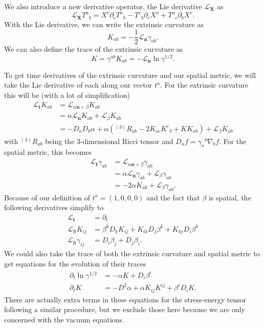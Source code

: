 \begin{bibunit}[unsrtnat]
We also introduce a new derivative operator, the Lie derivative
$\mathcal{L}_\mathbf{X}$ as
\begin{equation}
  \mathcal{L}_\mathbf{X} {T^a}_b = X^c\partial_c  {T^a}_b
      - {T^c}_b\partial_c X^a + {T^a}_c\partial_b X^c .
\end{equation}
With the Lie derivative, we can write the extrinsic curvature as
\begin{equation}
   K_{ab} = -\frac{1}{2}\mathcal{L}_\mathbf{n}\gamma_{ab} .
\end{equation}
We can also define the trace of the extrinsic curvature as
\begin{equation}
   K = \gamma^{ab}K_{ab} = -\mathcal{L}_\mathbf{n}\ln\gamma^{1/2} .
\end{equation}

To get time derivatives of the extrinsic curvature and our spatial metric, we
will take the Lie derivative of each along our vector $t^a$. For the extrinsic
curvature this will be (with a lot of simplification)
\begin{align}
   \mathcal{L}_\mathbf{t} K_{ab} &= \mathcal{L}_{\alpha\mathbf{n}+\beta} K_{ab} \nonumber\\
   &= \alpha\mathcal{L}_{\mathbf{n}} K_{ab} + \mathcal{L}_{\beta} K_{ab} \nonumber\\
   &= -D_aD_b\alpha +
      \alpha(^{(3)}R_{ab} - 2K_{ac}{K^c}_b + KK_{ab}) + \mathcal{L}_\beta K_{ab}
\end{align}
with $^{(3)}R_{ab}$ being the 3-dimensional Ricci tensor and
$D_af={\gamma_a}^b\nabla_b f$. For the spatial metric, this becomes
\begin{align}
   \mathcal{L}_\mathbf{t} \gamma_{ab} &= \mathcal{L}_{\alpha\mathbf{n}+\beta} \gamma_{ab} \nonumber\\
   &= \alpha\mathcal{L}_{\mathbf{n}} \gamma_{ab} + \mathcal{L}_{\beta} \gamma_{ab} \nonumber\\
   &= -2\alpha K_{ab} + \mathcal{L}_{\beta} \gamma_{ab} .
\end{align}
Because of our definition of $t^a=(1,0,0,0)$ and the fact that $\beta$ is
spatial, the following derivatives simplify to
\begin{align}
   \mathcal{L}_\mathbf{t} &= \partial_t \\
   \mathcal{L}_\mathbf{\beta} K_{ij} &= \beta^kD_kK_{ij} + K_{ik}D_j\beta^k + K_{kj}D_i\beta^k 
   \label{eq:dt_ext_curvature}\\
   \mathcal{L}_\mathbf{\beta} \gamma_{ij} &= D_i\beta_j + D_j\beta_i .\label{eq:dt_spatial_metric}
\end{align}
We could also take the trace of both the extrinsic curvature and spatial metric
to get equations for the evolution of their traces
\begin{align}
   \partial_t\ln\gamma^{1/2} &= -\alpha K + D_i\beta^i \\
   \partial_t K &= -D^2\alpha + \alpha K_{ij}K^{ij} + \beta^i D_i K .
\end{align}
There are actually extra terms in these equations for the stress-energy tensor
following a similar procedure, but we exclude those here because we are only
concerned with the vacuum equations.


\end{bibunit}
